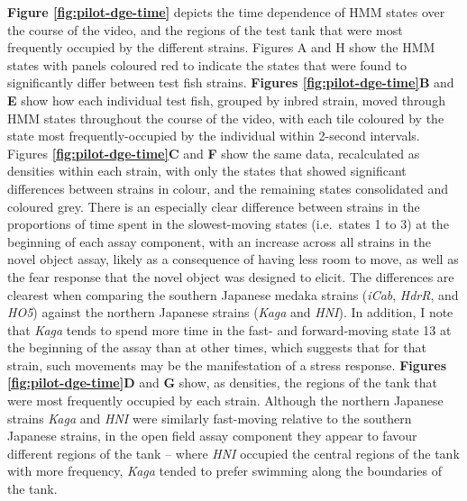 \documentclass[
]{book}
\begin{document}
\textbf{Figure \ref{fig:pilot-dge-time}} depicts the time dependence of HMM states over the course of the video, and the regions of the test tank that were most frequently occupied by the different strains. Figures A and H show the HMM states with panels coloured red to indicate the states that were found to significantly differ between test fish strains. \textbf{Figures \ref{fig:pilot-dge-time}B} and \textbf{E} show how each individual test fish, grouped by inbred strain, moved through HMM states throughout the course of the video, with each tile coloured by the state most frequently-occupied by the individual within 2-second intervals. Figures \textbf{\ref{fig:pilot-dge-time}C} and \textbf{F} show the same data, recalculated as densities within each strain, with only the states that showed significant differences between strains in colour, and the remaining states consolidated and coloured grey. There is an especially clear difference between strains in the proportions of time spent in the slowest-moving states (i.e.~states 1 to 3) at the beginning of each assay component, with an increase across all strains in the novel object assay, likely as a consequence of having less room to move, as well as the fear response that the novel object was designed to elicit. The differences are clearest when comparing the southern Japanese medaka strains (\emph{iCab}, \emph{HdrR}, and \emph{HO5}) against the northern Japanese strains (\emph{Kaga} and \emph{HNI}). In addition, I note that \emph{Kaga} tends to spend more time in the fast- and forward-moving state 13 at the beginning of the assay than at other times, which suggests that for that strain, such movements may be the manifestation of a stress response. \textbf{Figures \ref{fig:pilot-dge-time}D} and \textbf{G} show, as densities, the regions of the tank that were most frequently occupied by each strain. Although the northern Japanese strains \emph{Kaga} and \emph{HNI} were similarly fast-moving relative to the southern Japanese strains, in the open field assay component they appear to favour different regions of the tank -- where \emph{HNI} occupied the central regions of the tank with more frequency, \emph{Kaga} tended to prefer swimming along the boundaries of the tank.
\end{document}
